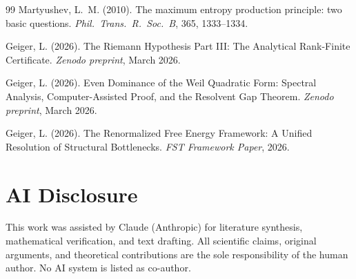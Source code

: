\documentclass[12pt,a4paper]{article}
\theoremstyle{remark}
\begin{document}
\begin{thebibliography}{99}
Martyushev, L.~M. (2010).
\newblock The maximum entropy production principle: two basic questions.
\newblock \textit{Phil.\ Trans.\ R.\ Soc.\ B}, 365, 1333--1334.

Geiger, L. (2026).
\newblock The Riemann Hypothesis Part III: The Analytical Rank-Finite Certificate.
\newblock \textit{Zenodo preprint}, March 2026.

Geiger, L. (2026).
\newblock Even Dominance of the Weil Quadratic Form: Spectral Analysis, Computer-Assisted Proof, and the Resolvent Gap Theorem.
\newblock \textit{Zenodo preprint}, March 2026.

Geiger, L. (2026).
\newblock The Renormalized Free Energy Framework: A Unified Resolution of Structural Bottlenecks.
\newblock \textit{FST Framework Paper}, 2026.

\end{thebibliography}

\section*{AI Disclosure}
This work was assisted by Claude (Anthropic) for literature synthesis, mathematical verification, and text drafting. All scientific claims, original arguments, and theoretical contributions are the sole responsibility of the human author. No AI system is listed as co-author.
\end{document}
